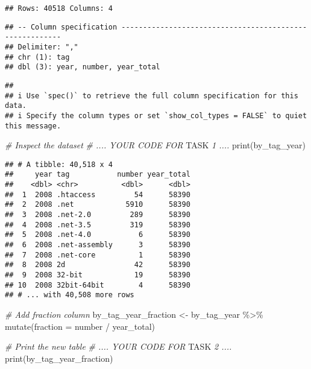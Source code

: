 \documentclass[
]{article}
\newenvironment{Shaded}{\begin{snugshade}}{\end{snugshade}}
\newcommand{\AlertTok}[1]{\textcolor[rgb]{0.94,0.16,0.16}{#1}}
\newcommand{\AttributeTok}[1]{\textcolor[rgb]{0.77,0.63,0.00}{#1}}
\newcommand{\CommentTok}[1]{\textcolor[rgb]{0.56,0.35,0.01}{\textit{#1}}}
\newcommand{\FunctionTok}[1]{\textcolor[rgb]{0.00,0.00,0.00}{#1}}
\newcommand{\NormalTok}[1]{#1}
\newcommand{\OtherTok}[1]{\textcolor[rgb]{0.56,0.35,0.01}{#1}}
\newcommand{\SpecialCharTok}[1]{\textcolor[rgb]{0.00,0.00,0.00}{#1}}
\begin{document}
\begin{verbatim}
## Rows: 40518 Columns: 4
\end{verbatim}

\begin{verbatim}
## -- Column specification --------------------------------------------------------
## Delimiter: ","
## chr (1): tag
## dbl (3): year, number, year_total
\end{verbatim}

\begin{verbatim}
## 
## i Use `spec()` to retrieve the full column specification for this data.
## i Specify the column types or set `show_col_types = FALSE` to quiet this message.
\end{verbatim}

\begin{Shaded}
\begin{Highlighting}[]
\CommentTok{\# Inspect the dataset}
\CommentTok{\# .... YOUR CODE FOR }\AlertTok{TASK}\CommentTok{ 1 ....}
\FunctionTok{print}\NormalTok{(by\_tag\_year)}
\end{Highlighting}
\end{Shaded}

\begin{verbatim}
## # A tibble: 40,518 x 4
##     year tag           number year_total
##    <dbl> <chr>          <dbl>      <dbl>
##  1  2008 .htaccess         54      58390
##  2  2008 .net            5910      58390
##  3  2008 .net-2.0         289      58390
##  4  2008 .net-3.5         319      58390
##  5  2008 .net-4.0           6      58390
##  6  2008 .net-assembly      3      58390
##  7  2008 .net-core          1      58390
##  8  2008 2d                42      58390
##  9  2008 32-bit            19      58390
## 10  2008 32bit-64bit        4      58390
## # ... with 40,508 more rows
\end{verbatim}

\begin{Shaded}
\begin{Highlighting}[]
\CommentTok{\# Add fraction column}
\NormalTok{by\_tag\_year\_fraction }\OtherTok{\textless{}{-}}\NormalTok{  by\_tag\_year }\SpecialCharTok{\%\textgreater{}\%}
  \FunctionTok{mutate}\NormalTok{(}\AttributeTok{fraction =}\NormalTok{ number }\SpecialCharTok{/}\NormalTok{ year\_total)}

\CommentTok{\# Print the new table}
\CommentTok{\# .... YOUR CODE FOR }\AlertTok{TASK}\CommentTok{ 2 ....}
\FunctionTok{print}\NormalTok{(by\_tag\_year\_fraction)}
\end{Highlighting}
\end{Shaded}
\end{document}
